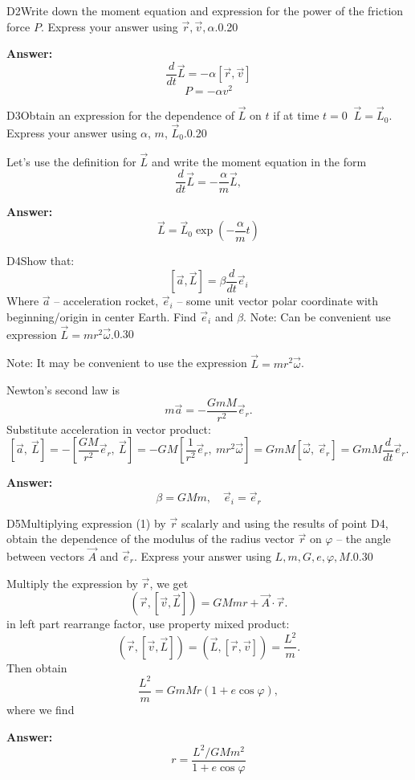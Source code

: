 \documentclass[11pt,a4paper]{article}
\begin{document}
\begin{solcard}{D2}{Write down the moment equation and expression for the power of the friction force $P$. Express your answer using $\vec r, \vec v, \alpha$.}{0.20}
\par\smallskip\noindent\textbf{Answer:} $$\frac{d}{dt} \vec{L}= -\alpha [\vec r, \vec v]$$ $$P=-\alpha v^2$$
\end{solcard}

\begin{solcard}{D3}{Obtain an expression for the dependence of $\vec L$ on $t$ if at time $t=0$ $~\vec L=\vec L_0$. Express your answer using $\alpha$, $m$, $\vec L_0$.}{0.20}

Let's use the definition for $\vec L$ and write the moment equation in the form $$\dfrac{d}{dt}\vec L=-\dfrac{\alpha}{m}\vec L,$$

\par\smallskip\noindent\textbf{Answer:} $$\vec L=\vec L_0 \exp\left(-\dfrac{\alpha}{m}t\right)$$
\end{solcard}

\begin{solcard}{D4}{Show that: $$[\vec a, \vec L]=\beta \frac{d}{dt}\vec e_i$$ Where $\vec a$ – acceleration rocket, $\vec e_i$ – some unit vector polar coordinate with beginning/origin in center Earth. Find $\vec e_i$ and $\beta$. Note: Can be convenient use expression $\vec L=mr^2 \vec\omega$.}{0.30}

Note: It may be convenient to use the expression $\vec L=mr^2 \vec\omega$.


Newton's second law is $$m\vec a=-\dfrac{GmM}{r^2}\vec e_r.$$Substitute acceleration in vector product: $$[\vec a, ~\vec L]=-\left[\dfrac{GM}{r^2}\vec e_r, ~\vec L\right]= -GM\left[\dfrac{1}{r^2}\vec e_r, ~mr^2\vec\omega\right] =GmM\left[\vec\omega,~\vec e_r\right]=GmM\dfrac{d}{dt}\vec e_r.$$

\par\smallskip\noindent\textbf{Answer:} $$\beta=GMm, \quad \vec e_i=\vec e_r$$
\end{solcard}

\begin{solcard}{D5}{Multiplying expression (1) by $\vec r$ scalarly and using the results of point D4, obtain the dependence of the modulus of the radius vector $\vec r$ on $\varphi$ – the angle between vectors $\vec A$ and $\vec e_r$. Express your answer using $L, m, G, e, \varphi, M$.}{0.30}

Multiply the expression by $\vec{r}$, we get $$ (\vec r, [\vec v, \vec L]) = GMmr + \vec{A} \cdot \vec{r}. $$in left part rearrange factor, use property mixed product: $$ (\vec r, [\vec v, \vec L]) = (\vec{L}, [\vec{r}, \vec{v}]) = \frac{L^2}{m}. $$Then obtain $$ \frac{L^2}{m} = GmMr(1 + e \cos \varphi), $$where we find

\par\smallskip\noindent\textbf{Answer:} $$r=\dfrac{L^2/GMm^2}{1+e\cos{\varphi}}$$
\end{solcard}
\end{document}
